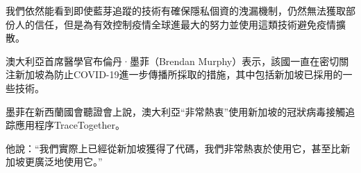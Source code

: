 \documentclass[12pt, a4paper]{report}
\begin{document}
\begin{figure}[H] %
    \centering %
\end{figure}

我們依然能看到即使藍芽追蹤的技術有確保隱私個資的洩漏機制，仍然無法獲取部份人的信任，但是為有效控制疫情全球進最大的努力並使用這類技術避免疫情擴散。

澳大利亞首席醫學官布倫丹·墨菲（Brendan Murphy）表示，該國一直在密切關注新加坡為防止COVID-19進一步傳播所採取的措施，其中包括新加坡已採用的一些技術。

墨菲在新西蘭國會聽證會上說，澳大利亞“非常熱衷”使用新加坡的冠狀病毒接觸追踪應用程序TraceTogether。

他說：“我們實際上已經從新加坡獲得了代碼，我們非常熱衷於使用它，甚至比新加坡更廣泛地使用它。”
\end{document}
